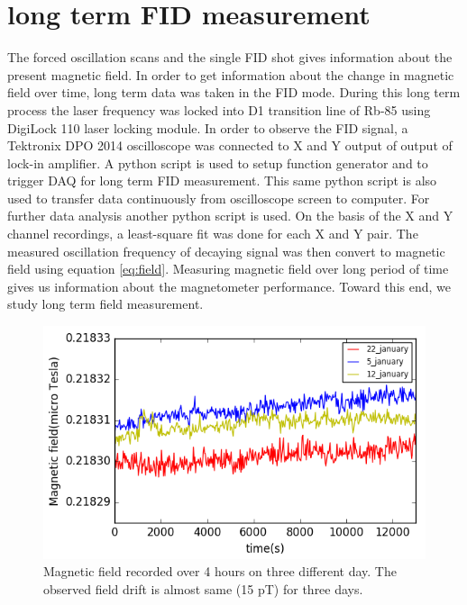   \section{long term FID measurement}  
The forced oscillation scans and the single FID shot gives information about the present magnetic field. In order to get information about the change in magnetic field over time, long term data was taken in the FID mode. During this long term process the laser frequency was locked into D1 transition line of Rb-85 using DigiLock 110 laser locking module. In order to observe the FID signal, a Tektronix DPO 2014 oscilloscope was connected to X and Y output of output of lock-in amplifier. A python script is used to setup function generator and to trigger DAQ for long term FID measurement. This same python script is also used to transfer data continuously from oscilloscope screen to computer. For further data analysis  another python script is used. On the basis of the X
and Y channel recordings, a least-square fit was done for each X and Y pair. The measured oscillation frequency of decaying signal was then convert to magnetic field using equation \ref{eq:field}.  Measuring magnetic field over long period of time gives us information about the magnetometer performance. Toward this end, we study long term field measurement.
\begin{figure}[h]
\centering\includegraphics[width=0.85\linewidth]{figures/field_3_day}
\caption{Magnetic field recorded over 4 hours on three different day. The observed field drift is almost same (15 pT) for three days.\label{fig:long term field}}
\end{figure}


